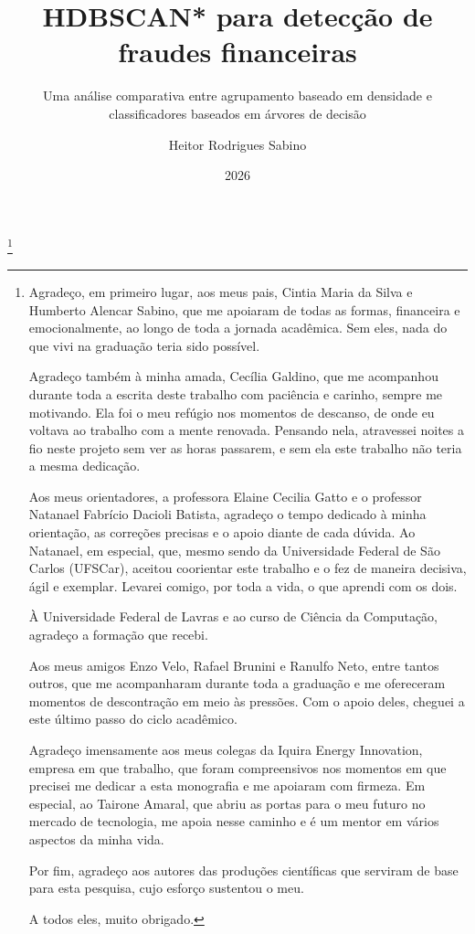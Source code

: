 \documentclass{uflamon}          %
\author{Heitor Rodrigues Sabino}
\title{HDBSCAN* para detecção de fraudes financeiras}
\subtitle{Uma análise comparativa entre agrupamento baseado em densidade e classificadores baseados em árvores de decisão}
\date{2026}
\begin{document}
\maketitle


\thanks{Agradeço, em primeiro lugar, aos meus pais, Cintia Maria da Silva e Humberto Alencar Sabino, que me apoiaram de todas as formas, financeira e emocionalmente, ao longo de toda a jornada acadêmica. Sem eles, nada do que vivi na graduação teria sido possível.

Agradeço também à minha amada, Cecília Galdino, que me acompanhou durante toda a escrita deste trabalho com paciência e carinho, sempre me motivando. Ela foi o meu refúgio nos momentos de descanso, de onde eu voltava ao trabalho com a mente renovada. Pensando nela, atravessei noites a fio neste projeto sem ver as horas passarem, e sem ela este trabalho não teria a mesma dedicação.

Aos meus orientadores, a professora Elaine Cecilia Gatto e o professor Natanael Fabrício Dacioli Batista, agradeço o tempo dedicado à minha orientação, as correções precisas e o apoio diante de cada dúvida. Ao Natanael, em especial, que, mesmo sendo da Universidade Federal de São Carlos (UFSCar), aceitou coorientar este trabalho e o fez de maneira decisiva, ágil e exemplar. Levarei comigo, por toda a vida, o que aprendi com os dois.

À Universidade Federal de Lavras e ao curso de Ciência da Computação, agradeço a formação que recebi.

Aos meus amigos Enzo Velo, Rafael Brunini e Ranulfo Neto, entre tantos outros, que me acompanharam durante toda a graduação e me ofereceram momentos de descontração em meio às pressões. Com o apoio deles, cheguei a este último passo do ciclo acadêmico.

Agradeço imensamente aos meus colegas da Iquira Energy Innovation, empresa em que trabalho, que foram compreensivos nos momentos em que precisei me dedicar a esta monografia e me apoiaram com firmeza. Em especial, ao Tairone Amaral, que abriu as portas para o meu futuro no mercado de tecnologia, me apoia nesse caminho e é um mentor em vários aspectos da minha vida.

Por fim, agradeço aos autores das produções científicas que serviram de base para esta pesquisa, cujo esforço sustentou o meu.

A todos eles, muito obrigado.}        
\end{document}
